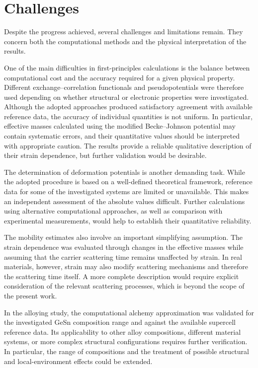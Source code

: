 \ornament

\section*{Challenges}

Despite the progress achieved, several challenges and limitations remain. They concern both the computational methods and the physical interpretation of the results.

One of the main difficulties in first-principles calculations is the balance between computational cost and the accuracy required for a given physical property. Different exchange--correlation functionals and pseudopotentials were therefore used depending on whether structural or electronic properties were investigated. Although the adopted approaches produced satisfactory agreement with available reference data, the accuracy of individual quantities is not uniform. In particular, effective masses calculated using the modified Becke--Johnson potential may contain systematic errors, and their quantitative values should be interpreted with appropriate caution. The results provide a reliable qualitative description of their strain dependence, but further validation would be desirable.

The determination of deformation potentials is another demanding task. While the adopted procedure is based on a well-defined theoretical framework, reference data for some of the investigated systems are limited or unavailable. This makes an independent assessment of the absolute values difficult. Further calculations using alternative computational approaches, as well as comparison with experimental measurements, would help to establish their quantitative reliability.

The mobility estimates also involve an important simplifying assumption. The strain dependence was evaluated through changes in the effective masses while assuming that the carrier scattering time remains unaffected by strain. In real materials, however, strain may also modify scattering mechanisms and therefore the scattering time itself. A more complete description would require explicit consideration of the relevant scattering processes, which is beyond the scope of the present work.

In the alloying study, the computational alchemy approximation was validated for the investigated GeSn composition range and against the available supercell reference data. Its applicability to other alloy compositions, different material systems, or more complex structural configurations requires further verification. In particular, the range of compositions and the treatment of possible structural and local-environment effects could be extended.

